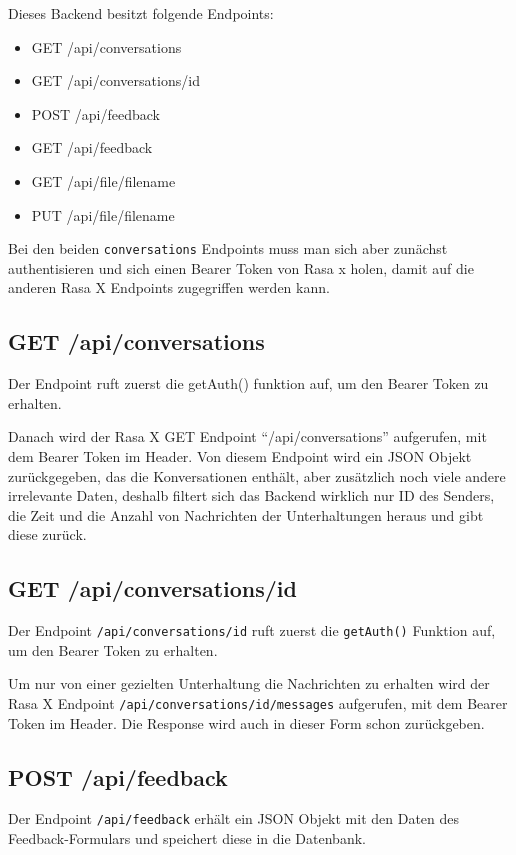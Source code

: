 Dieses Backend besitzt folgende Endpoints:

\begin{itemize}
    \item GET /api/conversations
    \item GET /api/conversations/{id}
    \item POST /api/feedback
    \item GET /api/feedback
    \item GET /api/file/{filename}
    \item PUT /api/file/{filename}
\end{itemize}

Bei den beiden \texttt{conversations} Endpoints muss man sich aber zunächst authentisieren und sich einen Bearer Token von Rasa x holen, damit auf die anderen Rasa X Endpoints zugegriffen werden kann.

\subsection{GET /api/conversations}
Der Endpoint ruft zuerst die getAuth() funktion auf, um den Bearer Token zu erhalten.

Danach wird der Rasa X GET Endpoint ``/api/conversations'' aufgerufen, mit dem Bearer Token im Header.
Von diesem Endpoint wird ein JSON Objekt zurückgegeben, das die Konversationen enthält, aber zusätzlich noch viele andere irrelevante Daten, deshalb filtert sich das Backend wirklich nur ID des Senders, die Zeit und die Anzahl von Nachrichten der Unterhaltungen heraus und gibt diese zurück.

\subsection{GET /api/conversations/{id}}
Der Endpoint \texttt{/api/conversations/{id}} ruft zuerst die \texttt{getAuth()} Funktion auf, um den Bearer Token zu erhalten.

Um nur von einer gezielten Unterhaltung die Nachrichten zu erhalten wird der Rasa X Endpoint \texttt{/api/conversations/{id}/messages} aufgerufen, mit dem Bearer Token im Header.
Die Response wird auch in dieser Form schon zurückgeben.

\subsection{POST /api/feedback}
Der Endpoint \texttt{/api/feedback} erhält ein JSON Objekt mit den Daten des Feedback-Formulars und speichert diese in die Datenbank.

